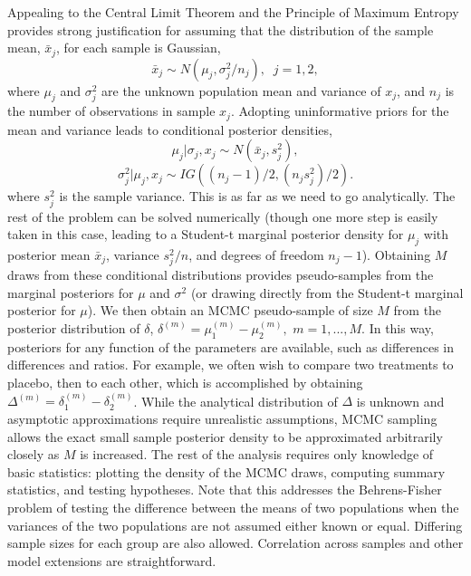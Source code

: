 \documentclass{juliacon}
\begin{document}
Appealing to the Central Limit Theorem and the Principle of Maximum Entropy provides strong justification for assuming that the distribution of the sample mean, $\bar{x}_j$, for each sample is Gaussian, 
\begin{equation}
\bar{x}_j \sim N(\mu_j,\sigma_j^2/n_j ), \; \;    j=1,2,
\label{eq:xbar}
\end{equation}
where $\mu_j$ and $\sigma_j^2$ are the unknown population mean and variance of $x_j$, and $n_j$ is the number of observations in sample $x_j$. Adopting uninformative priors for the mean and variance leads to conditional posterior densities,
\begin{equation}
\mu_j | \sigma_j,x_j \sim N(\bar{x}_j, s_j^2),
\label{eq:muj}
\end{equation}
\begin{equation}
\sigma_j^2|\mu_j,x_j \sim IG((n_j-1)/2,(n_js_j^2)/2).
\label{eq:sigmaj}
\end{equation}
where $s_j^2$ is the sample variance. This is as far as we need to go analytically.  The rest of the problem can be solved numerically (though one more step is easily taken in this case, leading to a Student-t marginal posterior density for $\mu_j$ with posterior mean $\bar{x}_j$, variance $s_j^2/n$, and degrees of freedom $n_j-1$).
\vskip 6pt
Obtaining $M$ draws from these conditional distributions provides pseudo-samples from the marginal posteriors for $\mu$ and $\sigma^2$ (or drawing directly from the Student-t marginal posterior for $\mu$).  We then obtain an MCMC pseudo-sample of size $M$ from the posterior distribution of $\delta$, $\delta^{(m)} = \mu_1^{(m)} - \mu_2^{(m)},$ $m = 1,...,M$.  In this way, posteriors for any function of the parameters are available, such as differences in differences and ratios. For example, we often wish to compare two treatments to placebo, then to each other, which is accomplished by obtaining $\Delta^{(m)} = \delta_1^{(m)} - \delta_2^{(m)}$. While the analytical distribution of $\Delta$ is unknown and asymptotic approximations require unrealistic assumptions,  MCMC sampling allows the exact small sample posterior density to be approximated arbitrarily closely as $M$ is increased. The rest of the analysis requires only knowledge of basic statistics: plotting the density of the MCMC draws, computing summary statistics, and testing hypotheses.   Note that this addresses the Behrens-Fisher problem of testing the difference between the means of two populations when the variances of the two populations are not assumed either known or equal\cite{Ramos2010}.  Differing sample sizes for each group are also allowed.  Correlation across samples and other model extensions are straightforward.
\end{document}
